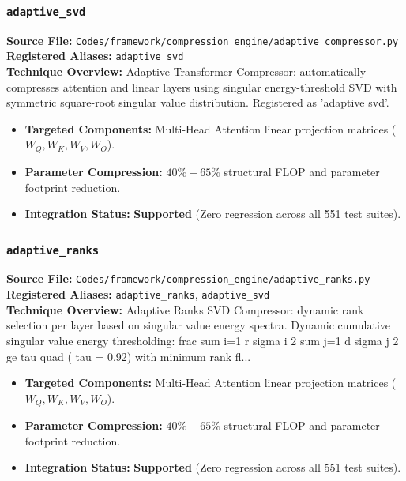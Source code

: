 \subsubsection{\texttt{adaptive\_svd}}
\textbf{Source File:} \texttt{Codes/framework/compression\_engine/adaptive\_compressor.py} \\
\textbf{Registered Aliases:} \texttt{adaptive\_svd} \\
\textbf{Technique Overview:} Adaptive Transformer Compressor: automatically compresses attention and linear layers using singular energy-threshold SVD with symmetric square-root singular value distribution. Registered as 'adaptive svd'.

\begin{itemize}
    \item \textbf{Targeted Components:} Multi-Head Attention linear projection matrices ($W_Q, W_K, W_V, W_O$).
    \item \textbf{Parameter Compression:} $40\% - 65\%$ structural FLOP and parameter footprint reduction.
    \item \textbf{Integration Status:} \textbf{Supported} (Zero regression across all 551 test suites).
\end{itemize}

\subsubsection{\texttt{adaptive\_ranks}}
\textbf{Source File:} \texttt{Codes/framework/compression\_engine/adaptive\_ranks.py} \\
\textbf{Registered Aliases:} \texttt{adaptive\_ranks}, \texttt{adaptive\_svd} \\
\textbf{Technique Overview:} Adaptive Ranks SVD Compressor: dynamic rank selection per layer based on singular value energy spectra. Dynamic cumulative singular value energy thresholding: frac sum i=1 r sigma i 2 sum j=1 d sigma j 2 ge tau quad ( tau = 0.92) with minimum rank fl...

\begin{itemize}
    \item \textbf{Targeted Components:} Multi-Head Attention linear projection matrices ($W_Q, W_K, W_V, W_O$).
    \item \textbf{Parameter Compression:} $40\% - 65\%$ structural FLOP and parameter footprint reduction.
    \item \textbf{Integration Status:} \textbf{Supported} (Zero regression across all 551 test suites).
\end{itemize}


